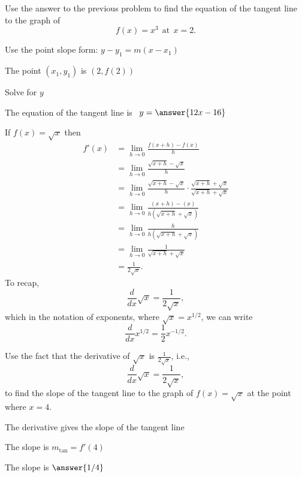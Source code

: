\documentclass{ximera}
\begin{document}
\begin{problem} %
Use the answer to the previous problem to find the equation of the tangent line to the graph of 
\[
f(x) = x^3 \ \ \text{at} \ \ x=2.
\]
\begin{hint}
Use the point slope form: $y-y_1 = m(x-x_1)$
\end{hint}
\begin{hint}
The point $(x_1,y_1)$ is $(2, f(2))$
\end{hint}
\begin{hint}
Solve for $y$
\end{hint}
The equation of the tangent line is \ $y = \answer{12x-16}$
\end{problem}


\begin{example} %
If $f(x) = \sqrt x$ then
\begin{align*}
f'(x) &= \lim_{h \to 0} \frac{f(x+h)-f(x)}{h}\\[5pt]
&= \lim_{h \to 0} \frac{\sqrt{x+h}- \sqrt x}{h}\\[5pt]
&= \lim_{h \to 0} \frac{\sqrt{x+h}- \sqrt x}{h} \cdot \frac{\sqrt{x+h}+ \sqrt x}{\sqrt{x+h}+ \sqrt x} \\[5pt]
&= \lim_{h \to 0} \frac{(x+h) - (x)}{h(\sqrt{x+h}+ \sqrt x)}\\[5pt]
&= \lim_{h \to 0} \frac{h}{h(\sqrt{x+h}+ \sqrt x)}\\[5pt]
&= \lim_{h \to 0} \frac{1}{\sqrt{x+h}+ \sqrt x}\\[5pt]
&=  \frac{1}{2 \sqrt x}.
\end{align*}
To recap, 
\[
\frac{d}{dx}\sqrt{x} = \frac{1}{2\sqrt{x}},
\]
which in the notation of exponents, where $\sqrt x = x^{1/2}$, we can write
\[
\frac{d}{dx}x^{1/2} = \frac12 x^{-1/2}.
\]

\end{example}


\begin{problem} %
Use the fact that the derivative of $\sqrt{x}$ is $\frac{1}{2\sqrt{x}}$,
i.e., 
\[
\frac{d}{dx}\sqrt{x} = \frac{1}{2\sqrt{x}},
\]
to find the slope of the tangent line to the graph of 
$f(x) = \sqrt{x}$ at the point where $x = 4$.\\
\begin{hint}
The derivative gives the slope of the tangent line
\end{hint}
\begin{hint}
The slope is $m_{\text{tan}} = f'(4)$
\end{hint}
The slope is $\answer{1/4}$
\end{problem}
\end{document}

